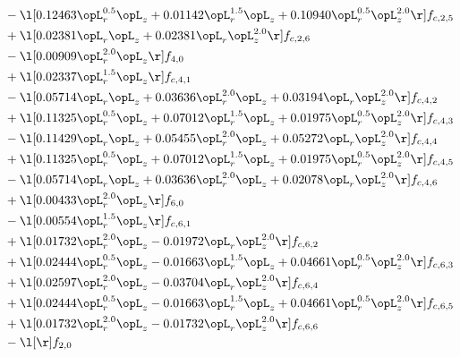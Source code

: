 \begin{alignat}{2}
& - \l[  0.12463 \opL_r^{0.5} \opL_z +  0.01142 \opL_r^{1.5} \opL_z +  0.10940 \opL_r^{0.5} \opL_z^{2.0}  \r] f_{c,2,5} \nonumber \\ 
& + \l[  0.02381 \opL_r \opL_z +  0.02381 \opL_r \opL_z^{2.0}  \r] f_{c,2,6} \nonumber \\ 
& - \l[  0.00909 \opL_r^{2.0} \opL_z  \r] f_{4,0} \nonumber \\ 
& + \l[  0.02337 \opL_r^{1.5} \opL_z  \r] f_{c,4,1} \nonumber \\ 
& - \l[  0.05714 \opL_r \opL_z +  0.03636 \opL_r^{2.0} \opL_z +  0.03194 \opL_r \opL_z^{2.0}  \r] f_{c,4,2} \nonumber \\ 
& + \l[  0.11325 \opL_r^{0.5} \opL_z +  0.07012 \opL_r^{1.5} \opL_z +  0.01975 \opL_r^{0.5} \opL_z^{2.0}  \r] f_{c,4,3} \nonumber \\ 
& - \l[  0.11429 \opL_r \opL_z +  0.05455 \opL_r^{2.0} \opL_z +  0.05272 \opL_r \opL_z^{2.0}  \r] f_{c,4,4} \nonumber \\ 
& + \l[  0.11325 \opL_r^{0.5} \opL_z +  0.07012 \opL_r^{1.5} \opL_z +  0.01975 \opL_r^{0.5} \opL_z^{2.0}  \r] f_{c,4,5} \nonumber \\ 
& - \l[  0.05714 \opL_r \opL_z +  0.03636 \opL_r^{2.0} \opL_z +  0.02078 \opL_r \opL_z^{2.0}  \r] f_{c,4,6} \nonumber \\ 
& + \l[  0.00433 \opL_r^{2.0} \opL_z  \r] f_{6,0} \nonumber \\ 
& - \l[  0.00554 \opL_r^{1.5} \opL_z  \r] f_{c,6,1} \nonumber \\ 
& + \l[  0.01732 \opL_r^{2.0} \opL_z   -0.01972 \opL_r \opL_z^{2.0}  \r] f_{c,6,2} \nonumber \\ 
& + \l[  0.02444 \opL_r^{0.5} \opL_z   -0.01663 \opL_r^{1.5} \opL_z +  0.04661 \opL_r^{0.5} \opL_z^{2.0}  \r] f_{c,6,3} \nonumber \\ 
& + \l[  0.02597 \opL_r^{2.0} \opL_z   -0.03704 \opL_r \opL_z^{2.0}  \r] f_{c,6,4} \nonumber \\ 
& + \l[  0.02444 \opL_r^{0.5} \opL_z   -0.01663 \opL_r^{1.5} \opL_z +  0.04661 \opL_r^{0.5} \opL_z^{2.0}  \r] f_{c,6,5} \nonumber \\ 
& + \l[  0.01732 \opL_r^{2.0} \opL_z   -0.01732 \opL_r \opL_z^{2.0}  \r] f_{c,6,6} \nonumber \\ 
& - \l[  \r] f_{2,0} \nonumber \\ 
\end{alignat} 


